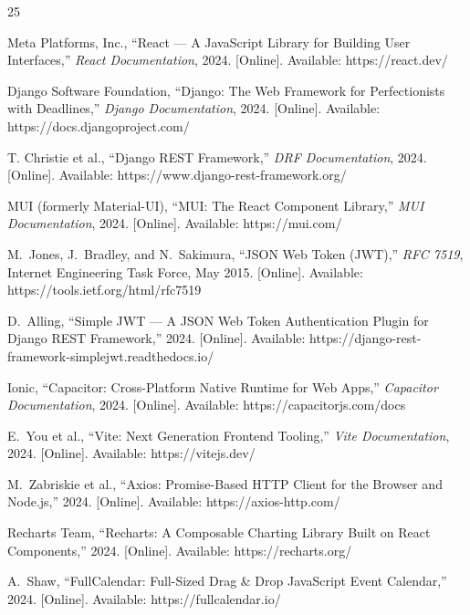 \newpage
{}
{}



\begin{thebibliography}{25}

Meta Platforms, Inc., ``React --- A JavaScript Library for Building User Interfaces,'' \textit{React Documentation}, 2024. [Online]. Available: https://react.dev/

Django Software Foundation, ``Django: The Web Framework for Perfectionists with Deadlines,'' \textit{Django Documentation}, 2024. [Online]. Available: https://docs.djangoproject.com/

T. Christie et al., ``Django REST Framework,'' \textit{DRF Documentation}, 2024. [Online]. Available: https://www.django-rest-framework.org/

MUI (formerly Material-UI), ``MUI: The React Component Library,'' \textit{MUI Documentation}, 2024. [Online]. Available: https://mui.com/

M.~Jones, J.~Bradley, and N.~Sakimura, ``JSON Web Token (JWT),'' \textit{RFC 7519}, Internet Engineering Task Force, May 2015. [Online]. Available: https://tools.ietf.org/html/rfc7519

D.~Alling, ``Simple JWT --- A JSON Web Token Authentication Plugin for Django REST Framework,'' 2024. [Online]. Available: https://django-rest-framework-simplejwt.readthedocs.io/

Ionic, ``Capacitor: Cross-Platform Native Runtime for Web Apps,'' \textit{Capacitor Documentation}, 2024. [Online]. Available: https://capacitorjs.com/docs

E.~You et al., ``Vite: Next Generation Frontend Tooling,'' \textit{Vite Documentation}, 2024. [Online]. Available: https://vitejs.dev/

M.~Zabriskie et al., ``Axios: Promise-Based HTTP Client for the Browser and Node.js,'' 2024. [Online]. Available: https://axios-http.com/

Recharts Team, ``Recharts: A Composable Charting Library Built on React Components,'' 2024. [Online]. Available: https://recharts.org/

A.~Shaw, ``FullCalendar: Full-Sized Drag \& Drop JavaScript Event Calendar,'' 2024. [Online]. Available: https://fullcalendar.io/


\end{thebibliography}
